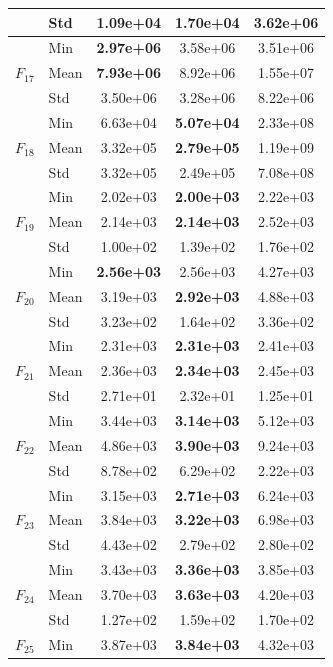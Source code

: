 \begin{center}
\begin{longtable}{clccc}
 & Std & 1.09e+04 & 1.70e+04 & 3.62e+06 \\
\midrule
\multirow{3}{*}{$F_{17}$} & Min & \textbf{2.97e+06} & 3.58e+06 & 3.51e+06 \\
 & Mean & \textbf{7.93e+06} & 8.92e+06 & 1.55e+07 \\
 & Std & 3.50e+06 & 3.28e+06 & 8.22e+06 \\
\midrule
\multirow{3}{*}{$F_{18}$} & Min & 6.63e+04 & \textbf{5.07e+04} & 2.33e+08 \\
 & Mean & 3.32e+05 & \textbf{2.79e+05} & 1.19e+09 \\
 & Std & 3.32e+05 & 2.49e+05 & 7.08e+08 \\
\midrule
\multirow{3}{*}{$F_{19}$} & Min & 2.02e+03 & \textbf{2.00e+03} & 2.22e+03 \\
 & Mean & 2.14e+03 & \textbf{2.14e+03} & 2.52e+03 \\
 & Std & 1.00e+02 & 1.39e+02 & 1.76e+02 \\
\midrule
\multirow{3}{*}{$F_{20}$} & Min & \textbf{2.56e+03} & 2.56e+03 & 4.27e+03 \\
 & Mean & 3.19e+03 & \textbf{2.92e+03} & 4.88e+03 \\
 & Std & 3.23e+02 & 1.64e+02 & 3.36e+02 \\
\midrule
\multirow{3}{*}{$F_{21}$} & Min & 2.31e+03 & \textbf{2.31e+03} & 2.41e+03 \\
 & Mean & 2.36e+03 & \textbf{2.34e+03} & 2.45e+03 \\
 & Std & 2.71e+01 & 2.32e+01 & 1.25e+01 \\
\midrule
\multirow{3}{*}{$F_{22}$} & Min & 3.44e+03 & \textbf{3.14e+03} & 5.12e+03 \\
 & Mean & 4.86e+03 & \textbf{3.90e+03} & 9.24e+03 \\
 & Std & 8.78e+02 & 6.29e+02 & 2.22e+03 \\
\midrule
\multirow{3}{*}{$F_{23}$} & Min & 3.15e+03 & \textbf{2.71e+03} & 6.24e+03 \\
 & Mean & 3.84e+03 & \textbf{3.22e+03} & 6.98e+03 \\
 & Std & 4.43e+02 & 2.79e+02 & 2.80e+02 \\
\midrule
\multirow{3}{*}{$F_{24}$} & Min & 3.43e+03 & \textbf{3.36e+03} & 3.85e+03 \\
 & Mean & 3.70e+03 & \textbf{3.63e+03} & 4.20e+03 \\
 & Std & 1.27e+02 & 1.59e+02 & 1.70e+02 \\
\midrule
\multirow{3}{*}{$F_{25}$} & Min & 3.87e+03 & \textbf{3.84e+03} & 4.32e+03 \\

\end{longtable}
\end{center}
